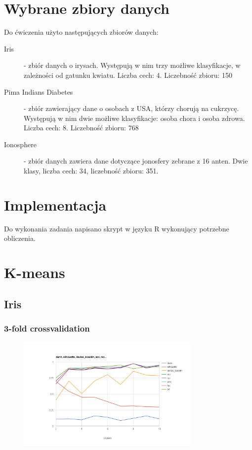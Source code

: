 \documentclass{article}
\begin{document}
\section{Wybrane zbiory danych}
Do ćwiczenia użyto następujących zbiorów danych:
\begin{description}
\item[Iris] -  zbiór danych o irysach. Występują w nim trzy możliwe klasyfikacje, w zależności od gatunku kwiatu. Liczba cech: 4. Liczebność zbioru: 150
\item[Pima Indians Diabetes] - zbiór zawierający dane o osobach z USA, którzy chorują na cukrzycę. Występują w nim dwie możliwe klasyfikacje: osoba chora i osoba zdrowa. Liczba cech: 8. Liczebność zbioru: 768
\item[Ionosphere] - zbiór danych zawiera dane dotyczące jonosfery zebrane z 16 anten. Dwie klasy, liczba cech: 34, liczebność zbioru: 351.
\end{description}

\section{Implementacja}
Do wykonania zadania napisano skrypt w języku R wykonujący potrzebne obliczenia.

\section{K-means}
\subsection{Iris}
\subsubsection{3-fold crossvalidation}
\begin{figure}[p]
    \centering
    \includegraphics[width=0.8\textwidth]{kmeans_iris.arff_3}
\end{figure}
\end{document}

